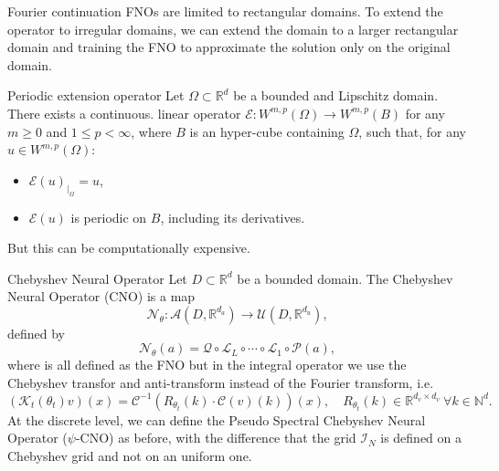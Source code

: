\documentclass{beamer}
\newcommand{\numberset}{\mathbb}
\newcommand{\N}{\numberset{N}}
\newcommand{\R}{\numberset{R}}
\begin{document}
\begin{frame}{Fourier continuation}
	FNOs are limited to rectangular domains. To extend the operator to irregular domains, we can extend the domain to a larger rectangular domain and training the FNO to approximate the solution only on the original domain.
	\begin{themedTitleBlock}{Periodic extension operator}
		Let $\Omega \subset \R^d$ be a bounded and Lipschitz domain. There exists a continuous. linear operator $\mathcal{E}: W^{m,p}(\Omega) \to W^{m,p}(B)$ for any $m \ge 0$ and $1 \le p < \infty$, where $B$ is an hyper-cube containing $\Omega$, such that, for any $u \in W^{m,p}(\Omega)$:
		\begin{itemize}
			\item $\mathcal{E}(u)_{|_{\Omega}} = u$, 
			\item $\mathcal{E}(u)$ is periodic on $B$, including its derivatives.
		\end{itemize}
	\end{themedTitleBlock}
	\pause	
	But this can be computationally expensive.

\end{frame}



\begin{frame}{Chebyshev Neural Operator}
	Let $ D \subset \R^d $ be a bounded domain. The Chebyshev Neural Operator (CNO) is a map
	\[ \mathcal{N}_{\theta}: \mathcal{A}(D, \R^{d_a}) \to \mathcal{U}(D, \R^{d_u}), \]
	defined by
	\[ \mathcal{N}_{\theta}(a) = \mathcal{Q} \circ \mathcal{L}_L \circ \cdots \circ \mathcal{L}_1 \circ \mathcal{P}(a), \]
	where is all defined as the FNO but in the integral operator we use the Chebyshev transfor and anti-transform instead of the Fourier transform, i.e.
	\[  (\mathcal{K}_t(\theta_t)v)(x)= \mathcal{C}^{-1}\left( R_{\theta_t}(k) \cdot \mathcal{C}(v)(k) \right)(x), \quad R_{\theta_t}(k) \in \R^{d_v \times d_v} \ \forall k \in \N^d. \]
	\pause 
	At the discrete level, we can define the Pseudo Spectral Chebyshev Neural Operator ($\psi$-CNO) as before, with the difference that the grid $ \mathcal{I}_N $ is defined on a Chebyshev grid and not on an uniform one.
\end{frame}

\end{document}
